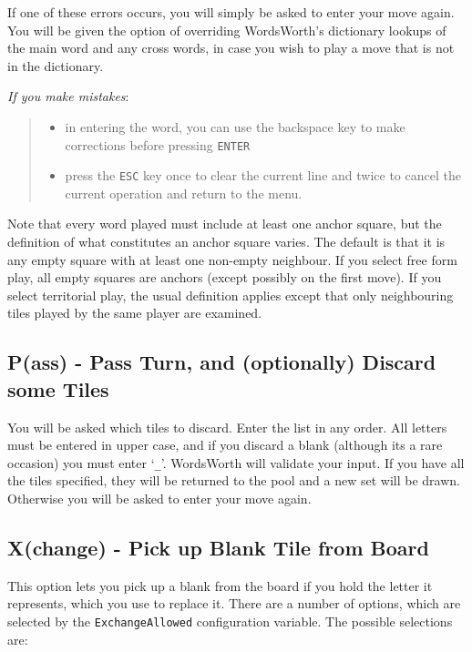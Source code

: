 If one of these errors occurs, you will simply be asked to enter
your move again. You will be given the option of overriding
WordsWorth's dictionary lookups of the main word and any cross words,
in case you wish to play a move that is not in the dictionary.

{\em If you make mistakes}:

\begin{verse}
\begin{itemize}
\item in entering the word, you can use the backspace
key to make corrections before pressing {\tt ENTER}
\item press the {\tt ESC} key once to clear the current line
and twice to cancel the current operation and return to the menu.
\end{itemize}
\end{verse}

Note that every word played must include at least one anchor
square, but the definition of what constitutes an anchor
square varies. The default is that it is any empty square
with at least one non-empty neighbour. If you select free
form play, all empty squares are anchors (except possibly on the first move). If you select territorial
play, the usual definition applies except that only neighbouring
tiles played by the same player are examined.


\subsection{P(ass) - Pass Turn, and (optionally) Discard some Tiles}

You will be asked which tiles to discard. Enter the list in any 
order. All letters must be entered in upper case, and if you 
discard a blank (although its a rare occasion) you must enter 
`{\tt \_}'. WordsWorth will validate your input. If you have all the
tiles specified, they will be returned to the pool and a new set
will be drawn. Otherwise you will be asked to enter your move again.

\subsection{X(change) - Pick up Blank Tile from Board}
\label{xchange}

This option lets you pick up a blank from the board if you hold the
letter it represents, which you use to replace it. There are a number
of options, which are selected by the {\tt ExchangeAllowed} configuration
variable. The possible selections are:

